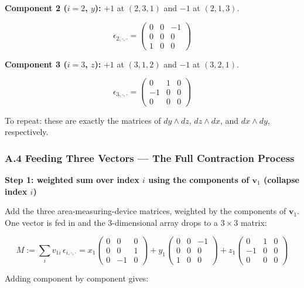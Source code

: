 \textbf{Component 2 (\(i=2\), \(y\)):} \(+1\) at \((2,3,1)\) and \(-1\)
at \((2,1,3)\).

\[\epsilon_{2,\cdot,\cdot} = \begin{pmatrix} 0 & 0 & -1 \\ 0 & 0 & 0 \\ 1 & 0 & 0 \end{pmatrix}\]

\textbf{Component 3 (\(i=3\), \(z\)):} \(+1\) at \((3,1,2)\) and \(-1\)
at \((3,2,1)\).

\[\epsilon_{3,\cdot,\cdot} = \begin{pmatrix} 0 & 1 & 0 \\ -1 & 0 & 0 \\ 0 & 0 & 0 \end{pmatrix}\]

To repeat: these are exactly the matrices of \(dy \wedge dz\),
\(dz \wedge dx\), and \(dx \wedge dy\), respectively.

\hypertarget{a.4-feeding-three-vectors-the-full-contraction-process}{%
\subsubsection{A.4 Feeding Three Vectors --- The Full Contraction
Process}\label{a.4-feeding-three-vectors-the-full-contraction-process}}

\textbf{Step 1: weighted sum over index \(i\) using the components of
\(\mathbf{v}_1\) (collapse index \(i\))}

Add the three area-measuring-device matrices, weighted by the components
of \(\mathbf{v}_1\). One vector is fed in and the \(3\)-dimensional
array drops to a \(3 \times 3\) matrix:

\[M := \sum_i v_{1i}\, \epsilon_{i,\cdot,\cdot} = x_1 \begin{pmatrix} 0 & 0 & 0 \\ 0 & 0 & 1 \\ 0 & -1 & 0 \end{pmatrix} + y_1 \begin{pmatrix} 0 & 0 & -1 \\ 0 & 0 & 0 \\ 1 & 0 & 0 \end{pmatrix} + z_1 \begin{pmatrix} 0 & 1 & 0 \\ -1 & 0 & 0 \\ 0 & 0 & 0 \end{pmatrix}\]

Adding component by component gives:

